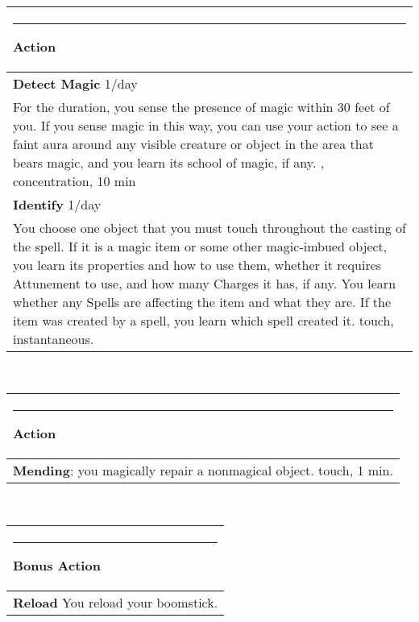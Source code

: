 \documentclass[twocolumn]{article}
\begin{document}
\\
\noindent\begin{tabular}{|m{3.1in}|}
\hline
\rule{1.25in}{0pt}Action\\
\hline
\textbf{Detect Magic} 1/day\\
For the duration, you sense the presence of magic within 30 feet of you. If you sense magic in this way, you can use your action to see a faint aura around any visible creature or object in the area that bears magic, and you learn its school of magic, if any.  {\sc 30, concentration, 10 min}\\
\textbf{Identify} 1/day\\
You choose one object that you must touch throughout the casting of the spell. If it is a magic item or some other magic-imbued object, you learn its properties and how to use them, whether it requires Attunement to use, and how many Charges it has, if any. You learn whether any Spells are affecting the item and what they are. If the item was created by a spell, you learn which spell created it. {\sc touch, instantaneous}.\\
\hline
\end{tabular}
\vspace{8pt}

\\
\noindent\begin{tabular}{|m{3.1in}|}
\hline
\rule{1.25in}{0pt}Action\\
\hline
\textbf{Mending}: you magically repair a nonmagical object. {\sc touch, 1 min.}\\
\hline
\end{tabular}
\vspace{8pt}

\\
\noindent\begin{tabular}{|m{3.1in}|}
\hline
\rule{1.25in}{0pt}Bonus Action\\
\hline
\textbf{Reload} You reload your boomstick. \\
\hline
\end{tabular}
\end{document}
